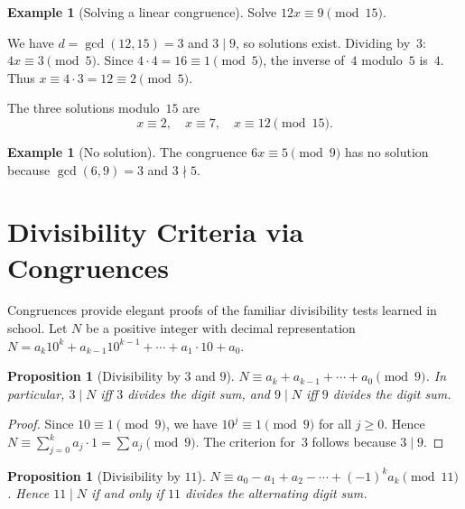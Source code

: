 \documentclass[12pt,a4paper,openany]{book}
\theoremstyle{definition}
\newtheorem{example}[definition]{Example}
\theoremstyle{plain}
\newtheorem{proposition}[definition]{Proposition}
\theoremstyle{remark}
\begin{document}
\begin{example}[Solving a linear congruence]
\label{ex:linear-cong}
Solve $12x \equiv 9 \pmod{15}$.

We have $d = \gcd(12, 15) = 3$ and $3 \mid 9$, so solutions exist.
Dividing by~$3$: $4x \equiv 3 \pmod{5}$.  Since $4 \cdot 4 = 16 \equiv 1
\pmod{5}$, the inverse of~$4$ modulo~$5$ is~$4$.  Thus
$x \equiv 4 \cdot 3 = 12 \equiv 2 \pmod{5}$.

The three solutions modulo~$15$ are
\[
  x \equiv 2, \quad x \equiv 7, \quad x \equiv 12 \pmod{15}.
\]
\end{example}

\begin{example}[No solution]
\label{ex:linear-cong-no-sol}
The congruence $6x \equiv 5 \pmod{9}$ has no solution because
$\gcd(6,9) = 3$ and $3 \nmid 5$.
\end{example}

\section{Divisibility Criteria via Congruences}
\label{sec:divisibility-criteria}

Congruences provide elegant proofs of the familiar divisibility tests
learned in school.  Let $N$ be a positive integer with decimal
representation $N = a_k 10^k + a_{k-1} 10^{k-1} + \cdots + a_1 \cdot 10 + a_0$.

\begin{proposition}[Divisibility by $3$ and $9$]
\label{prop:div-3-9}
$N \equiv a_k + a_{k-1} + \cdots + a_0 \pmod{9}$.
In particular, $3 \mid N$ iff $3$ divides the digit sum, and
$9 \mid N$ iff $9$ divides the digit sum.
\end{proposition}

\begin{proof}
Since $10 \equiv 1 \pmod{9}$, we have $10^j \equiv 1 \pmod{9}$ for all $j \ge 0$.
Hence $N \equiv \sum_{j=0}^{k} a_j \cdot 1 = \sum a_j \pmod{9}$.
The criterion for~$3$ follows because $3 \mid 9$.
\end{proof}

\begin{proposition}[Divisibility by $11$]
\label{prop:div-11}
$N \equiv a_0 - a_1 + a_2 - \cdots + (-1)^k a_k \pmod{11}$.
Hence $11 \mid N$ if and only if $11$ divides the alternating digit sum.
\end{proposition}
\end{document}
